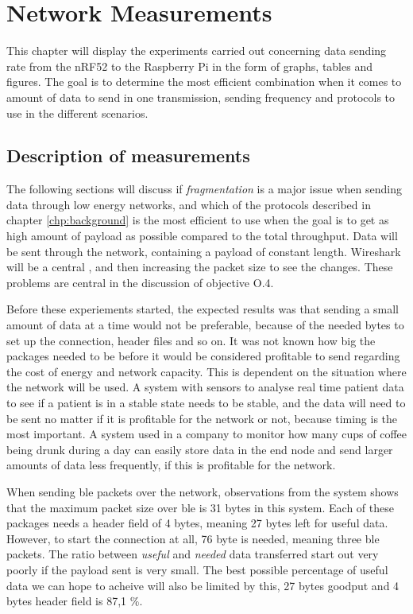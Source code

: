 \chapter{Network Measurements}
\label{chp:measurements2}


This chapter will display the experiments carried out concerning data sending rate from the \gls{nRF52} to the \gls{Raspberry Pi} in the form of graphs, tables and figures. The goal is to determine the most efficient combination when it comes to amount of data to send in one transmission, sending frequency and protocols to use in the different scenarios. 

\section{Description of measurements}

The following sections will discuss if \textit{fragmentation} is a major issue when sending data through low energy networks, and which of the protocols described in chapter \ref{chp:background}  is the most efficient to use when the goal is to get as high amount of \gls{payload} as possible compared to the total throughput. Data will be sent through the network, containing a payload of constant length. Wireshark will be a central , and then increasing the packet size to see the changes. These problems are central in the discussion of objective O.4. 

\noindent Before these experiements started, the expected results was that sending a small amount of data at a time would not be preferable, because of the needed bytes to set up the connection, header files and so on. It was not known how big the packages needed to be before it would be considered profitable to send regarding the cost of energy and network capacity. This is dependent on the situation where the network will be used. A system with sensors to analyse real time patient data to see if a patient is in a stable state needs to be stable, and the data will need to be sent no matter if it is profitable for the network or not, because timing is the most important. A system used in a company to monitor how many cups of coffee being drunk during a day can easily store data in the end node and send larger amounts of data less frequently, if this is profitable for the network. 

\noindent When sending \gls{ble} packets over the network, observations from the system shows that the maximum packet size over \gls{ble} is 31 bytes in this system. Each of these packages needs a header field of 4 bytes, meaning 27 bytes left for useful data. However, to start the connection at all, 76 byte is needed, meaning three \gls{ble} packets. The ratio between \textit{useful} and \textit{needed} data transferred start out very poorly if the payload sent is very small. The best possible percentage of useful data we can hope to acheive will also be limited by this, 27 bytes goodput and 4 bytes header field is 87,1 \%.  

